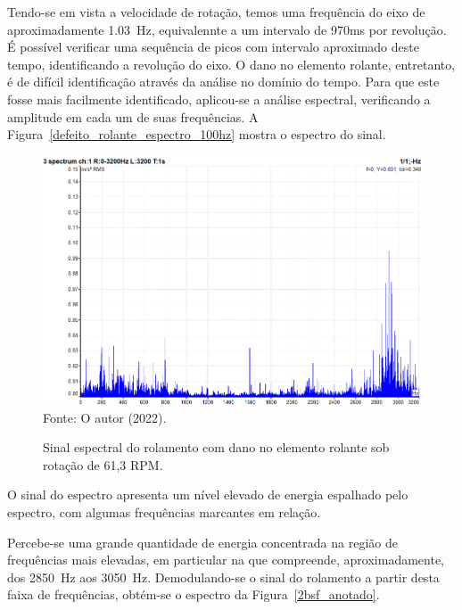 \documentclass[
	12pt,				
	oneside,			
	a4paper,			
	english,			
	brazil,			
	]{abntex2ppgsi}
\begin{document}
Tendo-se em vista a velocidade de rotação, temos uma frequência do eixo de aproximadamente \SI{1,03}{\hertz}, equivalennte a um intervalo de 970ms por revolução. É possível verificar uma sequência de picos com intervalo aproximado deste tempo, identificando a revolução do eixo. O dano no elemento rolante, entretanto, é de difícil identificação através da análise no domínio do tempo. Para que este fosse mais facilmente identificado, aplicou-se a análise espectral, verificando a amplitude em cada um de suas frequências. A Figura~\ref{defeito_rolante_espectro_100hz} mostra o espectro do sinal. 

\begin{figure}[H]
\centering
\caption {Sinal espectral do rolamento com dano no elemento rolante sob rotação de 61,3 RPM.}
\includegraphics[width=\textwidth,keepaspectratio]{ESPECTRO_ROLAMENTO_DEFEITO_ROLANTE_100HZ} \\
Fonte: O autor (2022).
\label{ESPECTRO_ROLAMENTO_DEFEITO_ROLANTE_100HZ}
\end{figure}

O sinal do espectro apresenta um nível elevado de energia espalhado pelo espectro, com algumas frequências marcantes em relação. 

Percebe-se uma grande quantidade de energia concentrada na região de frequências mais elevadas, em particular na que compreende, aproximadamente, dos \SI{2850}{\hertz} aos \SI{3050}{\hertz}. Demodulando-se o sinal do rolamento a partir desta faixa de frequências, obtém-se o espectro da Figura~\ref{2bsf_anotado}. 
\end{document}
